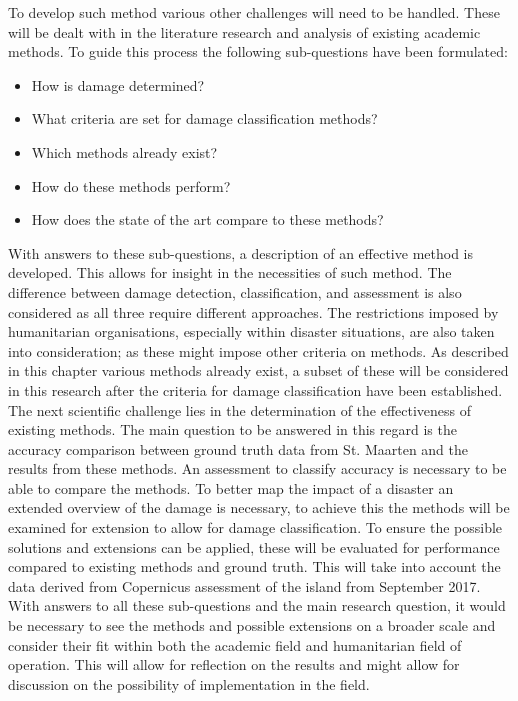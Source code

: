 \noindent To develop such method various other challenges will need to be handled. These will be dealt with in the literature research and analysis of existing academic methods. To guide this process the following sub-questions have been formulated:

\begin{itemize}
	\item How is damage determined?
	\item What criteria are set for damage classification methods?
	\item Which methods already exist?
	\item How do these methods perform?
	\item How does the state of the art compare to these methods?
\end{itemize}

\noindent With answers to these sub-questions, a description of an effective method is developed. This allows for insight in the necessities of such method. The difference between damage detection, classification, and assessment is also considered as all three require different approaches. The restrictions imposed by humanitarian organisations, especially within disaster situations, are also taken into consideration; as these might impose other criteria on methods. As described in this chapter various methods already exist, a subset of these will be considered in this research after the criteria for damage classification have been established. The next scientific challenge lies in the determination of the effectiveness of existing methods. The main question to be answered in this regard is the accuracy comparison between ground truth data from St. Maarten and the results from these methods. An assessment to classify accuracy is necessary to be able to compare the methods. To better map the impact of a disaster an extended overview of the damage is necessary, to achieve this the methods will be examined for extension to allow for damage classification. To ensure the possible solutions and extensions can be applied, these will be evaluated for performance compared to existing methods and ground truth. This will take into account the data derived from Copernicus assessment of the island from September 2017. With answers to all these sub-questions and the main research question, it would be necessary to see the methods and possible extensions on a broader scale and consider their fit within both the academic field and humanitarian field of operation. This will allow for reflection on the results and might allow for discussion on the possibility of implementation in the field.

